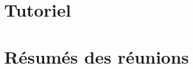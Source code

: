 \documentclass[a4paper,11pt]{report}
\begin{document}



\chapter{Tutoriel}



\chapter{Résumés des réunions}











\end{document}
